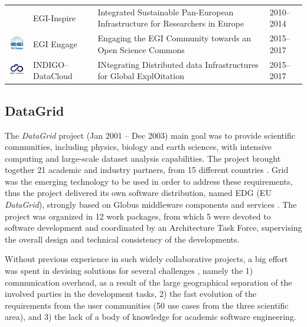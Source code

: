 \documentclass[journal]{IEEEtran}
\begin{document}
\begin{table}[!h]
\begin{tabular}{p{1.6cm}p{1.5cm}p{3cm}l}
\begin{minipage}{.3\textwidth}
\end{minipage}
     & EGI-Inspire &
Integrated Sustainable Pan-European Infrastructure for Researchers in Europe
 & 2010--2014\\
\begin{minipage}{.3\textwidth}
\includegraphics[width=15mm,height=7.5mm]{images/egi_engage}
\end{minipage}
     & EGI Engage &
Engaging the EGI Community towards an Open Science Commons
 & 2015--2017\\
\begin{minipage}{.3\textwidth}
\includegraphics[width=15mm,height=7.5mm]{images/indigo}
\end{minipage}
     & INDIGO--DataCloud &
INtegrating Distributed data Infrastructures for Global ExplOitation
 & 2015--2017\\
\hline
\hline
\end{tabular}
\end{table}

\subsection{DataGrid}

The {\sl DataGrid} \cite{cordis:datagrid} project (Jan 2001 -- Dec 2003)
main goal was to provide scientific communities, including physics, biology and
earth sciences, with intensive computing and large-scale dataset analysis capabilities.
The project brought together 21 academic and industry partners, from 15 different countries \cite{gagliardi}.
Grid was the emerging technology to be used in order to address these requirements,
thus the project delivered its own software distribution, named EDG (EU {\sl DataGrid}), strongly
based on Globus middleware components and services \cite{globus}. The project was organized in 12 work packages, from
which 5 were devoted to software development and coordinated by an
Architecture Task Force, supervising the overall design and technical consistency
of the developments.

Without previous experience in such widely
collaborative projects, a big effort was spent in devising solutions for several
challenges \cite{datagrid}, namely the 1) communication overhead, as a
result of the large geographical separation of the involved parties in the
development tasks, 2) the fast evolution of the requirements from the user
communities (50 use cases from the three scientific area), and 3) the lack of a body
of knowledge for academic software engineering.
\end{document}
